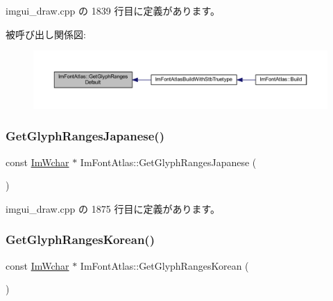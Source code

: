  imgui\+\_\+draw.\+cpp の 1839 行目に定義があります。

被呼び出し関係図\+:\nopagebreak
\begin{figure}[H]
\begin{center}
\leavevmode
\includegraphics[width=350pt]{struct_im_font_atlas_adec0df140eb1dc01c2a22a5253d62820_icgraph}
\end{center}
\end{figure}
\mbox{\label{struct_im_font_atlas_a2654afbbf73835bf08278cdc6c181a96}} 
\subsubsection{\texorpdfstring{Get\+Glyph\+Ranges\+Japanese()}{GetGlyphRangesJapanese()}}
{\footnotesize\ttfamily const \mbox{\hyperlink{imgui_8h_af2c7badaf05a0008e15ef76d40875e97}{Im\+Wchar}} $\ast$ Im\+Font\+Atlas\+::\+Get\+Glyph\+Ranges\+Japanese (\begin{DoxyParamCaption}{ }\end{DoxyParamCaption})}



 imgui\+\_\+draw.\+cpp の 1875 行目に定義があります。

\mbox{\label{struct_im_font_atlas_ac70e07bd35913661c8fc50413b3bf969}} 
\subsubsection{\texorpdfstring{Get\+Glyph\+Ranges\+Korean()}{GetGlyphRangesKorean()}}
{\footnotesize\ttfamily const \mbox{\hyperlink{imgui_8h_af2c7badaf05a0008e15ef76d40875e97}{Im\+Wchar}} $\ast$ Im\+Font\+Atlas\+::\+Get\+Glyph\+Ranges\+Korean (\begin{DoxyParamCaption}{ }\end{DoxyParamCaption})}



